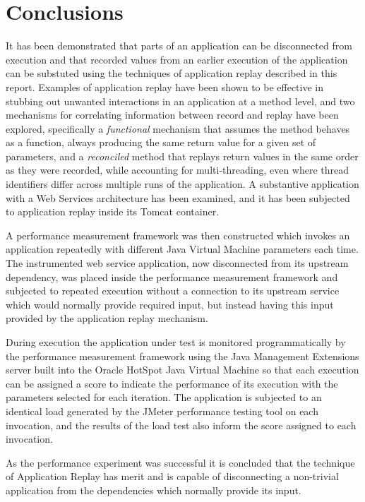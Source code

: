 \documentclass[]{final_report}
\begin{document}
\chapter{Conclusions \label{conclusions}}

It has been demonstrated that parts of an application can be disconnected from execution and that recorded values from an earlier execution of the application can be substuted using the techniques of application replay described in this report. Examples of application replay have been shown to be effective in stubbing out unwanted interactions in an application at a method level, and two mechanisms for correlating information between record and replay have been explored, specifically a \textit{functional} mechanism that assumes the method behaves as a function, always producing the same return value for a given set of parameters, and a \textit{reconciled} method that replays return values in the same order as they were recorded, while accounting for multi-threading, even where thread identifiers differ across multiple runs of the application. A substantive application with a Web Services architecture has been examined, and it has been subjected to application replay inside its Tomcat container. 

A performance measurement framework was then constructed which invokes an application repeatedly with different Java Virtual Machine parameters each time. The instrumented web service application, now disconnected from its upstream dependency, was placed inside the performance measurement framework and subjected to repeated execution without a connection to its upstream service which would normally provide required input, but instead having this input provided by the application replay mechanism.

During execution the application under test is monitored programmatically by the performance measurement framework using the Java Management Extensions server built into the Oracle HotSpot Java Virtual Machine so that each execution can be assigned a score to indicate the performance of its execution with the parameters selected for each iteration. The application is subjected to an identical load generated by the JMeter performance testing tool on each invocation, and the results of the load test also inform the score assigned to each invocation.

As the performance experiment was successful it is concluded that the technique of Application Replay has merit and is capable of disconnecting a non-trivial application from the dependencies which normally provide its input.
\end{document}
